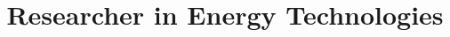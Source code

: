 \documentclass[11pt,a4paper,sans]{moderncv}        %
\title{Researcher in Energy Technologies}
\begin{document}
\makecvtitle %



\newpage



\end{document}
